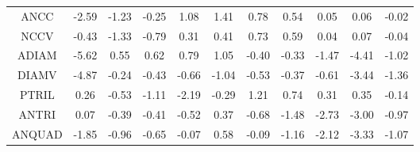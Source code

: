 \begin{longtable}{ | c || c | c | c | c | c | c | c | c | c || c |}
ANCC &  \cellcolor[HTML]{FFBFBF} -2.59 &  \cellcolor[HTML]{FFDFDF} -1.23 &  \cellcolor[HTML]{FFF7F7} -0.25 &  \cellcolor[HTML]{E7E7FF} 1.08 &  \cellcolor[HTML]{DFDFFF} 1.41 &  \cellcolor[HTML]{EFEFFF} 0.78 &  \cellcolor[HTML]{EFEFFF} 0.54 &  \cellcolor[HTML]{FFFFFF} 0.05 &  \cellcolor[HTML]{FFFFFF} 0.06 &  \cellcolor[HTML]{FFFFFF} -0.02 \\
NCCV &  \cellcolor[HTML]{FFF7F7} -0.43 &  \cellcolor[HTML]{FFDFDF} -1.33 &  \cellcolor[HTML]{FFEFEF} -0.79 &  \cellcolor[HTML]{F7F7FF} 0.31 &  \cellcolor[HTML]{F7F7FF} 0.41 &  \cellcolor[HTML]{EFEFFF} 0.73 &  \cellcolor[HTML]{EFEFFF} 0.59 &  \cellcolor[HTML]{FFFFFF} 0.04 &  \cellcolor[HTML]{FFFFFF} 0.07 &  \cellcolor[HTML]{FFFFFF} -0.04 \\
ADIAM &  \cellcolor[HTML]{FF7070} -5.62 &  \cellcolor[HTML]{EFEFFF} 0.55 &  \cellcolor[HTML]{EFEFFF} 0.62 &  \cellcolor[HTML]{EFEFFF} 0.79 &  \cellcolor[HTML]{E7E7FF} 1.05 &  \cellcolor[HTML]{FFF7F7} -0.40 &  \cellcolor[HTML]{FFF7F7} -0.33 &  \cellcolor[HTML]{FFD7D7} -1.47 &  \cellcolor[HTML]{FF8F8F} -4.41 &  \cellcolor[HTML]{FFE7E7} -1.02 \\
DIAMV &  \cellcolor[HTML]{FF8787} -4.87 &  \cellcolor[HTML]{FFF7F7} -0.24 &  \cellcolor[HTML]{FFF7F7} -0.43 &  \cellcolor[HTML]{FFEFEF} -0.66 &  \cellcolor[HTML]{FFE7E7} -1.04 &  \cellcolor[HTML]{FFEFEF} -0.53 &  \cellcolor[HTML]{FFF7F7} -0.37 &  \cellcolor[HTML]{FFEFEF} -0.61 &  \cellcolor[HTML]{FFA7A7} -3.44 &  \cellcolor[HTML]{FFDFDF} -1.36 \\
PTRIL &  \cellcolor[HTML]{F7F7FF} 0.26 &  \cellcolor[HTML]{FFEFEF} -0.53 &  \cellcolor[HTML]{FFE7E7} -1.11 &  \cellcolor[HTML]{FFC7C7} -2.19 &  \cellcolor[HTML]{FFF7F7} -0.29 &  \cellcolor[HTML]{DFDFFF} 1.21 &  \cellcolor[HTML]{EFEFFF} 0.74 &  \cellcolor[HTML]{F7F7FF} 0.31 &  \cellcolor[HTML]{F7F7FF} 0.35 &  \cellcolor[HTML]{FFFFFF} -0.14 \\
ANTRI &  \cellcolor[HTML]{FFFFFF} 0.07 &  \cellcolor[HTML]{FFF7F7} -0.39 &  \cellcolor[HTML]{FFF7F7} -0.41 &  \cellcolor[HTML]{FFEFEF} -0.52 &  \cellcolor[HTML]{F7F7FF} 0.37 &  \cellcolor[HTML]{FFEFEF} -0.68 &  \cellcolor[HTML]{FFD7D7} -1.48 &  \cellcolor[HTML]{FFB7B7} -2.73 &  \cellcolor[HTML]{FFB7B7} -3.00 &  \cellcolor[HTML]{FFE7E7} -0.97 \\
ANQUAD &  \cellcolor[HTML]{FFCFCF} -1.85 &  \cellcolor[HTML]{FFE7E7} -0.96 &  \cellcolor[HTML]{FFEFEF} -0.65 &  \cellcolor[HTML]{FFFFFF} -0.07 &  \cellcolor[HTML]{EFEFFF} 0.58 &  \cellcolor[HTML]{FFFFFF} -0.09 &  \cellcolor[HTML]{FFDFDF} -1.16 &  \cellcolor[HTML]{FFC7C7} -2.12 &  \cellcolor[HTML]{FFA7A7} -3.33 &  \cellcolor[HTML]{FFE7E7} -1.07 \\

\end{longtable}
